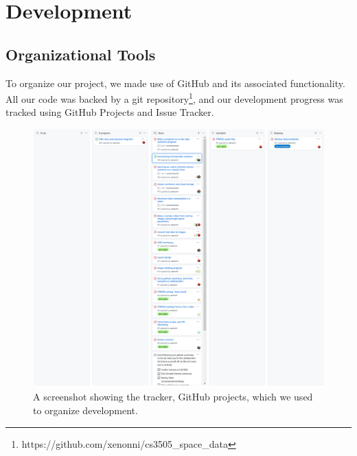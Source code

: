 \documentclass{article}
\begin{document}
\section{Development}
  \subsection{Organizational Tools}
  To organize our project, we made use of GitHub and its associated functionality. All our code was backed by a git repository\footnote{https://github.com/xenonni/cs3505\_space\_data}, and our development progress was tracked using GitHub Projects and Issue Tracker.
  \begin{figure}[H]
    \centering
    \includegraphics[width=0.75\linewidth]{img/github_projects.png}
    \caption{A screenshot showing the tracker, GitHub projects, which we used to organize development.}
    \label{github_projects}
  \end{figure}
\end{document}
